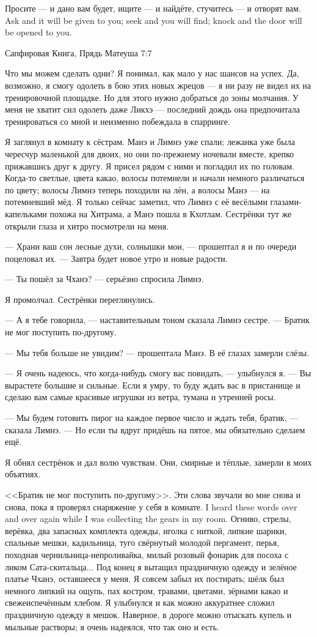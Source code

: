 \epigraph{
{Просите --- и дано вам будет, ищите --- и найдёте, стучитесь --- и отворят вам.}
{Ask and it will be given to you; seek and you will find; knock and the door will be opened to you.}
}{Сапфировая Книга, Прядь Матеуша 7:7}

Что мы можем сделать одни?
Я понимал, как мало у нас шансов на успех.
Да, возможно, я смогу одолеть в бою этих новых жрецов --- я ни разу не видел их на тренировочной площадке.
Но для этого нужно добраться до зоны молчания.
У меня не хватит сил одолеть даже Ликхэ --- последний дождь она предпочитала тренироваться со мной и неизменно побеждала в спарринге.

Я заглянул в комнату к сёстрам.
Манэ и Лимнэ уже спали;
лежанка уже была чересчур маленькой для двоих, но они по-прежнему ночевали вместе, крепко прижавшись друг к другу.
Я присел рядом с ними и погладил их по головам.
Когда-то светлые, цвета какао, волосы потемнели и начали немного различаться по цвету;
волосы Лимнэ теперь походили на лён, а волосы Манэ --- на потемневший мёд.
Я только сейчас заметил, что Лимнэ с её весёлыми глазами-капельками похожа на Хитрама, а Манэ пошла в Кхотлам.
Сестрёнки тут же открыли глаза и хитро посмотрели на меня.

--- Храни ваш сон лесные духи, солнышки мои, --- прошептал я и по очереди поцеловал их.
--- Завтра будет новое утро и новые радости.

--- Ты пошёл за Чханэ? --- серьёзно спросила Лимнэ.

Я промолчал.
Сестрёнки переглянулись.

--- А я тебе говорила, --- наставительным тоном сказала Лимнэ сестре.
--- Братик не мог поступить по-другому.

--- Мы тебя больше не увидим? --- прошептала Манэ.
В её глазах замерли слёзы.

--- Я очень надеюсь, что когда-нибудь смогу вас повидать, --- улыбнулся я.
--- Вы вырастете большие и сильные.
Если я умру, то буду ждать вас в пристанище и сделаю вам самые красивые игрушки из ветра, тумана и утренней росы.

--- Мы будем готовить пирог на каждое первое число и ждать тебя, братик, --- сказала Лимнэ.
--- Но если ты вдруг придёшь на пятое, мы обязательно сделаем ещё.

Я обнял сестрёнок и дал волю чувствам.
Они, смирные и тёплые, замерли в моих объятиях.

<<Братик не мог поступить по-другому>>.
{Эти слова звучали во мне снова и снова, пока я проверял снаряжение у себя в комнате.}
{I heard these words over and over again while I was collecting the gears in my room.}
Огниво, стрелы, верёвка, два запасных комплекта одежды, иголка с ниткой, липкие шарики, спальные мешки, кадильница, туго свёрнутый молодой пергамент, перья, походная чернильница-непроливайка, милый розовый фонарик для посоха с ликом Сата-скитальца...
Под конец я вытащил праздничную одежду и зелёное платье Чханэ, оставшееся у меня.
Я совсем забыл их постирать;
шёлк был немного липкий на ощупь, пах костром, травами, цветами, зёрнами какао и свежеиспечённым хлебом.
Я улыбнулся и как можно аккуратнее сложил праздничную одежду в мешок.
Наверное, в дороге можно отыскать купель и мыльные растворы;
я очень надеялся, что так оно и есть.

